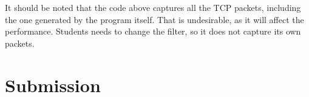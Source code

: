 It should be noted that the code above captures all the TCP
packets, including the one generated by the program itself. That is
undesirable, as it will affect
the performance. Students needs to change the filter, so it does not capture
its own packets.




\section{Submission}








